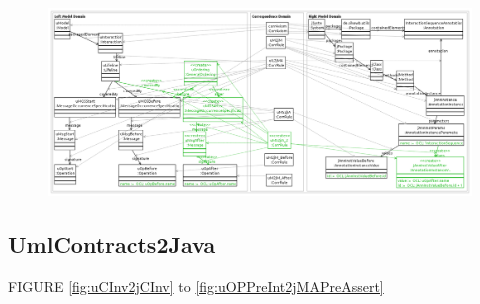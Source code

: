 \documentclass[tuberlin,cic,tc,english,noabntcite]{iiufrgs}
\begin{document}
\begin{figure}[h]
    \caption{}
    \begin{center}
        \includegraphics[width=40em]{uMessageSequence2jInteractionAnnotation_2}
    \end{center}
    \label{fig:uMessageSequence2jInteractionAnnotation_2}
\end{figure}


\subsection{UmlContracts2Java}
\label{subsec:UmlContracts2Java}
FIGURE \ref{fig:uCInv2jCInv} to \ref{fig:uOPPreInt2jMAPreAssert}
\end{document}
